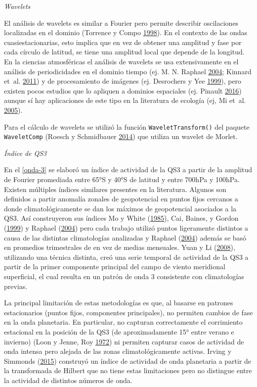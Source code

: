 \documentclass[spanish,a4paper,12p]{book}
\begin{document}
\emph{Wavelets}

El análisis de wavelets es similar a Fourier pero permite describir
oscilaciones localizadas en el dominio (Torrence y Compo
\protect\hyperlink{ref-Torrence1998}{1998}). En el contexto de las ondas
cuasiestacionarias, esto implica que en vez de obtener una amplitud y
fase por cada círculo de latitud, se tiene una amplitud local que
depende de la longitud. En la ciencias atmosféricas el análisis de
wavelets se usa extensivamente en el análisis de periodicidades en el
dominio tiempo (ej. M. N. Raphael
\protect\hyperlink{ref-Raphael2004}{2004}; Kinnard et~al.
\protect\hyperlink{ref-Kinnard2011}{2011}) y de procesamiento de
imágenes (ej. Desrochers y Yee
\protect\hyperlink{ref-Desrochers1999}{1999}), pero existen pocos
estudios que lo apliquen a dominios espaciales (ej. Pinault
\protect\hyperlink{ref-Pinault2016}{2016}) aunque sí hay aplicaciones de
este tipo en la literatura de ecología (ej, Mi et~al.
\protect\hyperlink{ref-Mi2005}{2005}).

Para el cálculo de wavelets se utilizó la función
\texttt{WaveletTransform()} del paquete \texttt{WaveletComp} (Roesch y
Schmidbauer \protect\hyperlink{ref-R-WaveletComp}{2014}) que utiliza un
wavelet de Morlet.

\emph{Índice de QS3}

En el \autoref{onda-3} se elaboró un índice de actividad de la QS3 a
partir de la amplitud de Fourier promediada entre 65°S y 40°S de latitud
y entre 700hPa y 100hPa. Existen múltiples índices similares presentes
en la literatura. Algunos son definidos a partir anomalía zonales de
geopotencial en puntos fijos cercanos a donde climatológicamente se dan
los máximos de geopotencial asociados a la QS3. Así construyeron sus
índices Mo y White (\protect\hyperlink{ref-Mo1985}{1985}), Cai, Baines,
y Gordon (\protect\hyperlink{ref-Cai1999}{1999}) y Raphael
(\protect\hyperlink{ref-Raphael2004a}{2004}) pero cada trabajo utilizó
puntos ligeramente distintos a causa de las distintas climatologías
analizadas y Raphael (\protect\hyperlink{ref-Raphael2004a}{2004}) además
se basó en promedios trimestrales de en vez de medias mensuales. Yuan y
Li (\protect\hyperlink{ref-Yuan2008}{2008}), utilizando una técnica
distinta, creó una serie temporal de actividad de la QS3 a partir de la
primer componente principal del campo de viento meridional superficial,
el cual resulta en un patrón de onda 3 consistente con climatologías
previas.

La principal limitación de estas metodologías es que, al basarse en
patrones estacionarios (puntos fijos, componentes principales), no
permiten cambios de fase en la onda planetaria. En particular, no
capturan correctamente el corrimiento estacional en la posición de la
QS3 (de aproximadamente 15° entre verano e invierno) (Loon y Jenne, Roy
\protect\hyperlink{ref-Loon1972}{1972}) ni permiten capturar casos de
actividad de onda intensa pero alejada de las zonas climatológicamente
activas. Irving y Simmonds (\protect\hyperlink{ref-Irving2015}{2015})
construyó un índice de actividad de onda planetaria a partir de la
transformada de Hilbert que no tiene estas limitaciones pero no
distingue entre la actividad de distintos números de onda.
\end{document}
